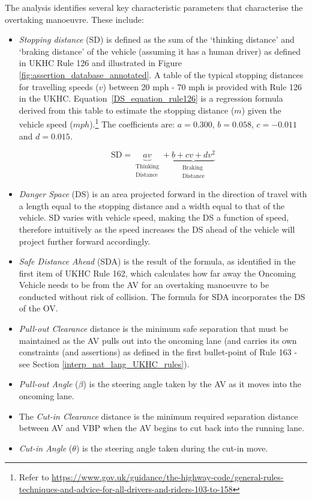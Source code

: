 The analysis identifies several key characteristic parameters that characterise the overtaking manoeuvre. These include:
\begin{itemize}
    \item \emph{Stopping distance} (SD) is defined as the sum of the `thinking distance' and `braking distance' of the vehicle (assuming it has a human driver) as defined in UKHC Rule 126 and illustrated in Figure \ref{fig:assertion_database_annotated}.
    A table of the typical stopping distances for travelling speeds ($v$) between 20 mph - 70 mph is provided with Rule 126 in the UKHC.
    Equation~\ref{DS_equation_rule126} is a regression formula derived from this table to estimate the stopping distance ($m$) given the vehicle speed ($mph$).\footnote{Refer to \url{https://www.gov.uk/guidance/the-highway-code/general-rules-techniques-and-advice-for-all-drivers-and-riders-103-to-158}} The coefficients are: $a=0.300$, $b=0.058$, $c=-0.011$ and $d=0.015$.
    
\begin{equation} 
\label{DS_equation_rule126}
\text{SD} = \underbrace{av }_{\substack{\text{Thinking} \\ \text{Distance}}} + \underbrace{b + cv + dv^2}_{\substack{\text{Braking} \\ \text{Distance}}}
\end{equation}

    \item \emph{Danger Space} (DS) is an area projected forward in the direction of travel with a length equal to the stopping distance and a width equal to that of the vehicle.
    SD varies with vehicle speed, making the DS a function of speed, therefore intuitively as the speed increases the DS ahead of the vehicle will project further forward accordingly.
    
    \item \emph{Safe Distance Ahead} (SDA) is the result of the formula, as identified in the first item of UKHC Rule 162, which calculates how far away the Oncoming Vehicle needs to be from the AV for an overtaking manoeuvre to be conducted without risk of collision. The formula for SDA incorporates the DS of the OV. 
    
    \item \emph{Pull-out Clearance} distance is the minimum safe separation that must be maintained as the AV pulls out into the oncoming lane (and carries its own constraints (and assertions) as defined in the first bullet-point of Rule 163 - see Section \ref{interp_nat_lang_UKHC_rules}).
    
    \item \emph{Pull-out Angle} ($\beta$) is the steering angle taken by the AV as it moves into the oncoming lane.
    \item The \emph{Cut-in Clearance} distance is the minimum required separation distance between AV and VBP when the AV begins to cut back into the running lane.
    
    \item \emph{Cut-in Angle} ($\theta$) is the steering angle taken during the cut-in move.
\end{itemize}

